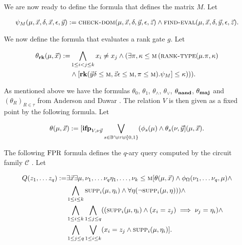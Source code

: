 \documentclass[../paper.tex]{subfiles}
\begin{document}
We are now ready to define the formula that defines the matrix $M$. Let
				
\begin{align*}
	\psi_M (\mu, \vec{x}, \delta, \vec{x}, \epsilon, \vec{y}) :=  \textsc{check-dom}(\mu, \vec{x}, \delta, \vec{y}, \epsilon, \vec{z}) \land \textsc{find-eval} (\mu, \vec{x}, \delta, \vec{y}, \epsilon, \vec{z}).
\end{align*}
				
We now define the formula that evaluates a rank gate $g$. Let
				
\begin{align*}
	\theta_{\text{\textbf{rk}}} (\mu, \vec{x}) := & \bigwedge_{1 \leq i < j \leq k} x_i \neq x_j \land (\exists \pi, \kappa \leq \textsc{m} \, (\textsc{rank-type}(\mu. \pi, \kappa) \\ &\land [\text{\textbf{rk}} (\vec{y}\delta\leq \textsc{m}, \vec{z}\epsilon\leq \textsc{m}, \pi \leq \textsc{m}). \psi_M] \leq \kappa ))).
\end{align*}
				
As mentioned above we have the formulas $\theta_0$, $\theta_1$, $\theta_\land$,
$\theta_\lor$, $\theta_{\text{\textbf{nand}}}$, $\theta_{\text{\textbf{maj}}}$ and $(\theta_R)_{R \in \tau}$ from
Anderson and Dawar \cite{AndersonD17}. The relation $V$ is then given as a fixed
point by the following formula. Let

\begin{align*}
	\theta (\mu, \vec{x}) := [\text{\textbf{ifp}}_{V,\nu \vec{y}} \bigvee_{s \in \mathbb{B}' \uplus \tau \uplus \{0,1\}} (\phi_s(\mu) \land \theta_s (\nu, \vec{y} ] (\mu, \vec{x}).
\end{align*}

The following $\text{\upshape FPR}$ formula defines the $q$-ary query computed by the circuit
family $\mathcal{C}$ \cite{AndersonD17}. Let
				
\begin{align*}
	Q (z_1, \ldots z_q) := & \exists \vec{x} \exists \mu, \nu_1 , \ldots  \nu_q \eta_1 , \ldots , \nu_k \leq \textsc{m} [\theta (\mu, \vec{x}) \land \phi_\Omega (\nu_1, \ldots \nu_q, \mu) \land \\
                         & \bigwedge_{1 \leq i \leq k} \textsc{supp}_i (\mu, \eta_i) \wedge \forall \eta (\neg \textsc{supp}_i (\mu, \eta))) \land \\
                         & \bigwedge_{1 \leq i \leq k} \bigwedge_{1 \leq j \leq q}((\textsc{supp}_i (\mu, \eta_i) \land (x_i = z_j) \implies \nu_j = \eta_i) \land \\ &
                                                                                                                                                                    \bigwedge_{1 \leq j \leq q} \bigvee_{1 \leq i \leq k} (x_i = z_j \land \textsc{supp}_i (\mu, \eta_i)].
\end{align*}
				
\end{document}
